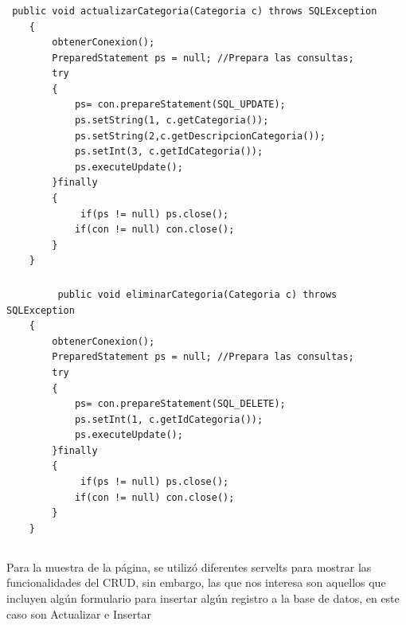 \documentclass[10pt,a4paper]{article}
\begin{document}
\subsubsection{\color{colorGENERICO}{Actualizar}}
\begin{lstlisting}
 public void actualizarCategoria(Categoria c) throws SQLException
    {
        obtenerConexion();
        PreparedStatement ps = null; //Prepara las consultas;
        try
        {
            ps= con.prepareStatement(SQL_UPDATE);
            ps.setString(1, c.getCategoria());
            ps.setString(2,c.getDescripcionCategoria());
            ps.setInt(3, c.getIdCategoria());
            ps.executeUpdate();
        }finally
        {
             if(ps != null) ps.close();
            if(con != null) con.close();      
        }
    }
\end{lstlisting} \hfill


\subsubsection{\color{colorGENERICO}{Borrar}}
\begin{lstlisting}
	     public void eliminarCategoria(Categoria c) throws SQLException
    {
        obtenerConexion();
        PreparedStatement ps = null; //Prepara las consultas;
        try
        {
            ps= con.prepareStatement(SQL_DELETE);
            ps.setInt(1, c.getIdCategoria());
            ps.executeUpdate();
        }finally
        {
             if(ps != null) ps.close();
            if(con != null) con.close();      
        }
    }
\end{lstlisting} \hfill

\subsection{\color{colorESCOM}{Formularios y validaciones}}
\normalsize{
Para la muestra de la página, se utilizó diferentes servelts para mostrar las funcionalidades del 
CRUD, sin embargo, las que nos interesa son aquellos que incluyen algún formulario para insertar algún 
registro a la base de datos, en este caso son Actualizar e Insertar
}
\end{document}
